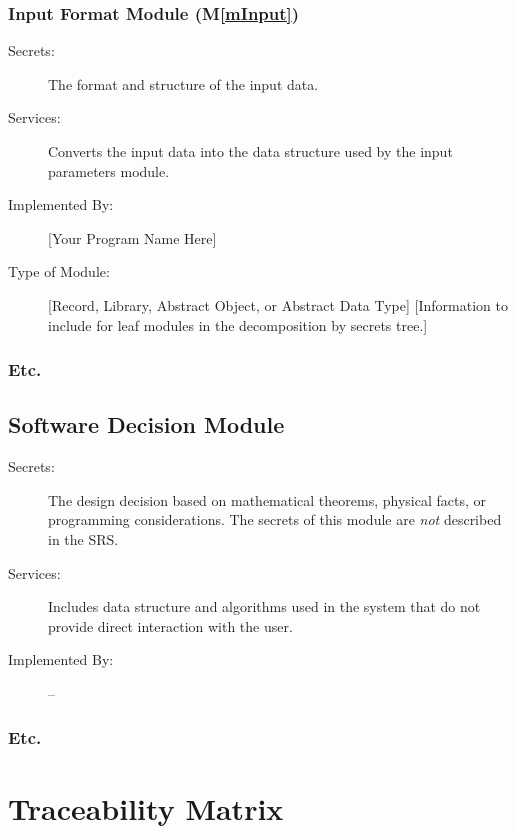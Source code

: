 \documentclass[12pt, titlepage]{article}
\newcommand{\mref}[1]{M\ref{#1}}
\begin{document}
\subsubsection{Input Format Module (\mref{mInput})}

\begin{description}
	\item[Secrets:]The format and structure of the input data.
	\item[Services:]Converts the input data into the data structure used by the input parameters module.
	\item[Implemented By:] [Your Program Name Here]
	\item[Type of Module:] [Record, Library, Abstract Object, or Abstract Data Type] [Information to include
		for leaf modules in the decomposition by secrets tree.]
\end{description}

\subsubsection{Etc.}

\subsection{Software Decision Module}

\begin{description}
	\item[Secrets:] The design decision based on mathematical theorems, physical facts, or programming
		considerations. The secrets of this module are \emph{not} described in the SRS.
	\item[Services:] Includes data structure and algorithms used in the system that do not provide direct
		interaction with the user.
	\item[Implemented By:] --
\end{description}

\subsubsection{Etc.}

\section{Traceability Matrix} \label{SecTM}
\end{document}
